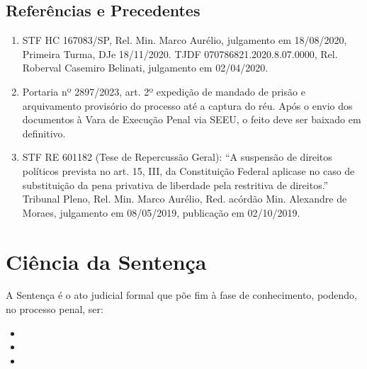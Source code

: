 \documentclass[letterpaper,10pt,brazil]{sphinxmanual}
\begin{document}
\subsection{Referências e Precedentes}
\label{\detokenize{08sentenca_disposicoesfinais:referencias-e-precedentes}}\begin{enumerate}
%
\item {} 
\sphinxAtStartPar
STF \sphinxhyphen{} HC 167083/SP, Rel. Min. Marco Aurélio, julgamento em 18/08/2020, Primeira Turma, DJe 18/11/2020.
TJ\sphinxhyphen{}DF 0707868\sphinxhyphen{}21.2020.8.07.0000, Rel. Roberval Casemiro Belinati, julgamento em 02/04/2020.

\item {} 
\sphinxAtStartPar
Portaria nº 2897/2023, art. 2º \textendash{} expedição de mandado de prisão e arquivamento provisório do processo até a captura do réu.
Após o envio dos documentos à Vara de Execução Penal via SEEU, o feito deve ser baixado em definitivo.

\item {} 
\sphinxAtStartPar
STF \textendash{} RE 601182 (Tese de Repercussão Geral):
“A suspensão de direitos políticos prevista no art. 15, III, da Constituição Federal aplica\sphinxhyphen{}se no caso de substituição da pena privativa de liberdade pela restritiva de direitos.”
Tribunal Pleno, Rel. Min. Marco Aurélio, Red. acórdão Min. Alexandre de Moraes, julgamento em 08/05/2019, publicação em 02/10/2019.

\end{enumerate}

\sphinxstepscope


\section{Ciência da Sentença}
\label{\detokenize{08_5cienciasentenca:ciencia-da-sentenca}}\label{\detokenize{08_5cienciasentenca::doc}}
\sphinxAtStartPar
A Sentença é o ato judicial formal que põe fim à fase de conhecimento, podendo, no processo penal, ser:
\begin{itemize}
\item {} 
\sphinxAtStartPar
{}

\item {} 
\sphinxAtStartPar
{}

\item {} 
\sphinxAtStartPar
{}

\end{itemize}
\end{document}
